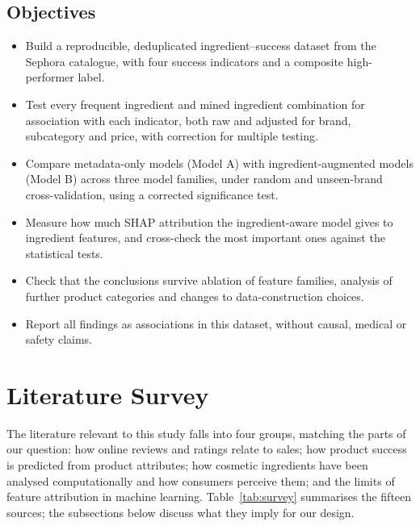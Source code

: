 \documentclass[11pt,a4paper]{article}
\newcommand{\draft}[1]{{\color{blue!70!black}#1}}
\begin{document}
\subsection{Objectives}
\draft{\begin{itemize}
\item Build a reproducible, deduplicated ingredient--success dataset from the Sephora catalogue, with four success indicators and a composite high-performer label.
\item Test every frequent ingredient and mined ingredient combination for association with each indicator, both raw and adjusted for brand, subcategory and price, with correction for multiple testing.
\item Compare metadata-only models (Model A) with ingredient-augmented models (Model B) across three model families, under random and unseen-brand cross-validation, using a corrected significance test.
\item Measure how much SHAP attribution the ingredient-aware model gives to ingredient features, and cross-check the most important ones against the statistical tests.
\item Check that the conclusions survive ablation of feature families, analysis of further product categories and changes to data-construction choices.
\item Report all findings as associations in this dataset, without causal, medical or safety claims.
\end{itemize}}

\section{Literature Survey}
\draft{The literature relevant to this study falls into four groups, matching the parts of our question: how online reviews and ratings relate to sales; how product success is predicted from product attributes; how cosmetic ingredients have been analysed computationally and how consumers perceive them; and the limits of feature attribution in machine learning. Table~\ref{tab:survey} summarises the fifteen sources; the subsections below discuss what they imply for our design.}
\end{document}
